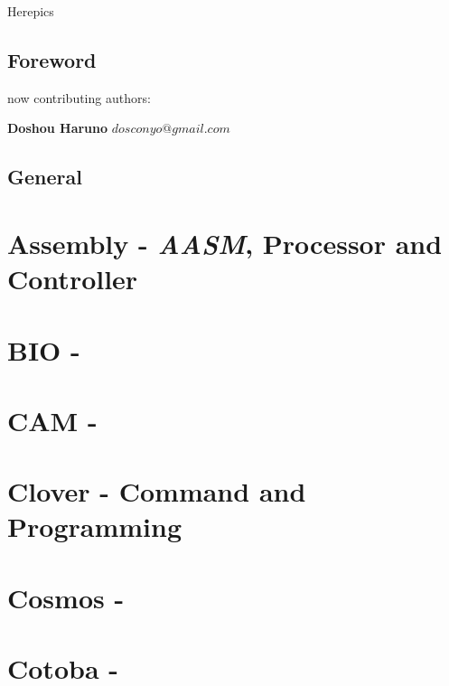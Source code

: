 \documentclass[a4paper,12pt,UTF8]{book}
\begin{document}
\author{dosconio}
\begin{center}
	\sc\fontsize{48pt}{0}\selectfont\textcolor[rgb]{1, 0, 0.618}{Herepics}
\end{center}

\newpage %
\renewcommand{\contentsname}{Contents}
\tableofcontents

\section{Foreword} %

now contributing authors:

\textbf{Doshou Haruno}
$dosconyo@gmail.com$

\section{General}


\chapter{Assembly \mbox{-} \textit{AASM}, Processor and Controller}


\chapter{BIO \mbox{-} }


\chapter{CAM \mbox{-} }


\chapter{Clover \mbox{-} Command and Programming}


\chapter{Cosmos \mbox{-} }


\chapter{Cotoba \mbox{-} }

\end{document}
